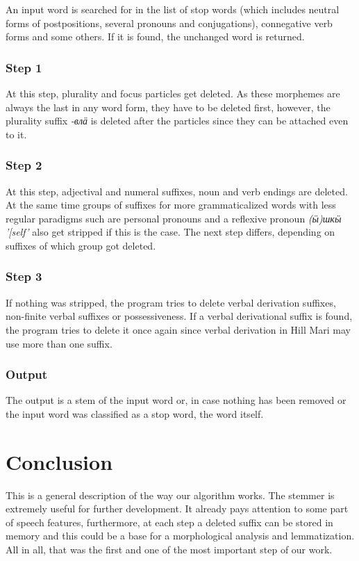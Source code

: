 \documentclass[a4paper,notitlepage]{article}
\begin{document}
An input word is searched for in the list of stop words (which includes neutral forms of postpositions, several pronouns and conjugations), connegative verb forms and some others. If it is found, the unchanged word is returned.

\subsubsection{Step 1}
At this step, plurality and focus particles get deleted. As these morphemes are always the last in any word form, they have to be deleted first, however, the plurality suffix \textit{-влӓ} is deleted after the particles since they can be attached even to it.

\subsubsection{Step 2}

At this step, adjectival and numeral suffixes, noun and verb endings are deleted. At the same time groups of suffixes for more grammaticalized words with less regular paradigms such are personal pronouns and a reflexive pronoun \emph{(ӹ)шкӹ '[self'} also get stripped if this is the case.
The next step differs, depending on suffixes of which group got deleted.

\subsubsection{Step 3}

If nothing was stripped, the program tries to delete verbal derivation suffixes, non-finite verbal suffixes or possessiveness. If a verbal derivational suffix is found, the program tries to delete it once again since verbal derivation in Hill Mari may use more than one suffix.

\subsubsection{Output}

The output is a stem of the input word or, in case nothing has been removed or the input word was classified as a stop word, the word itself.

\section{Conclusion}

This is a general description of the way our algorithm works. The stemmer is extremely useful for further development. It already pays attention to some part of speech features, furthermore, at each step a deleted suffix can be stored in memory and this could be a base for a morphological analysis and lemmatization. All in all, that was the first and one of the most important step of our work. 

\nocite{*}


\end{document}
